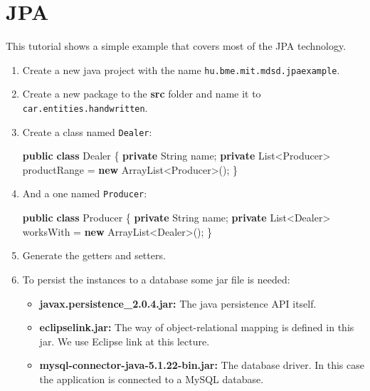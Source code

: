 \documentclass[]{report}
\newenvironment{Shaded}{}{}
\newcommand{\KeywordTok}[1]{\textcolor[rgb]{0.00,0.44,0.13}{\textbf{{#1}}}}
\newcommand{\NormalTok}[1]{{#1}}
\begin{document}
\chapter{JPA}

This tutorial shows a simple example that covers most of the JPA
technology.

\begin{enumerate}
\def\labelenumi{\arabic{enumi}.}
\item
  Create a new java project with the name
  \texttt{hu.bme.mit.mdsd.jpaexample}.
\item
  Create a new package to the \textbf{src} folder and name it to
  \texttt{car.entities.handwritten}.
\item
  Create a class named \texttt{Dealer}:

\begin{Shaded}
\begin{Highlighting}[]
\KeywordTok{public} \KeywordTok{class} \NormalTok{Dealer \{}
  \KeywordTok{private} \NormalTok{String name;}
  \KeywordTok{private} \NormalTok{List<Producer> productRange = }\KeywordTok{new} \NormalTok{ArrayList<Producer>();}
\NormalTok{\}}
\end{Highlighting}
\end{Shaded}
\item
  And a one named \texttt{Producer}:

\begin{Shaded}
\begin{Highlighting}[]
\KeywordTok{public} \KeywordTok{class} \NormalTok{Producer \{}
  \KeywordTok{private} \NormalTok{String name;}
  \KeywordTok{private} \NormalTok{List<Dealer> worksWith = }\KeywordTok{new} \NormalTok{ArrayList<Dealer>();}
\NormalTok{\}}
\end{Highlighting}
\end{Shaded}
\item
  Generate the getters and setters.
\item
  To persist the instances to a database some jar file is needed:

  \begin{itemize}
  \itemsep1pt\parskip0pt
  \item
    \textbf{javax.persistence\_2.0.4.jar:} The java persistence API
    itself.
  \item
    \textbf{eclipselink.jar:} The way of object-relational mapping is
    defined in this jar. We use Eclipse link at this lecture.
  \item
    \textbf{mysql-connector-java-5.1.22-bin.jar:} The database driver.
    In this case the application is connected to a MySQL database.
  \end{itemize}


\end{enumerate}
\end{document}
